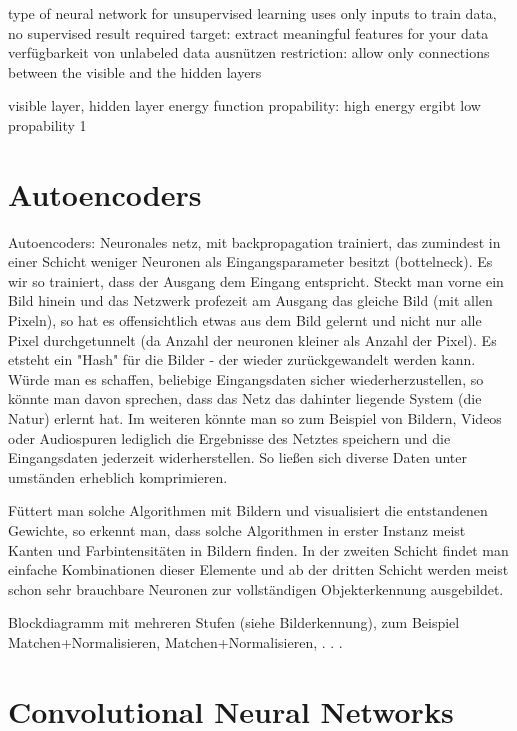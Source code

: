 type of neural network for unsupervised learning
uses only inputs to train data, no supervised result required
target: extract meaningful features for your data
verfügbarkeit von unlabeled data ausnützen
restriction: allow only connections between the visible and the hidden layers

visible layer, hidden layer
energy function
propability: high energy ergibt low propability
1


\section{Autoencoders}

Autoencoders: Neuronales netz, mit backpropagation trainiert, das zumindest in einer Schicht weniger Neuronen als Eingangsparameter besitzt (bottelneck). Es wir so trainiert, dass der Ausgang dem Eingang entspricht. Steckt man vorne ein Bild hinein und das Netzwerk profezeit am Ausgang das gleiche Bild (mit allen Pixeln), so hat es offensichtlich etwas aus dem Bild gelernt und nicht nur alle Pixel durchgetunnelt (da Anzahl der neuronen kleiner als Anzahl der Pixel).
Es etsteht ein "Hash" für die Bilder - der wieder zurückgewandelt werden kann. Würde man es schaffen, beliebige Eingangsdaten sicher wiederherzustellen, so könnte man davon sprechen, dass das Netz das dahinter liegende System (die Natur) erlernt hat. Im weiteren könnte man so zum Beispiel von Bildern, Videos oder Audiospuren lediglich die Ergebnisse des Netztes speichern und die Eingangsdaten jederzeit widerherstellen. So ließen sich diverse Daten unter umständen erheblich komprimieren.

Füttert man solche Algorithmen mit Bildern und visualisiert die entstandenen Gewichte, so erkennt man, dass solche Algorithmen in erster Instanz meist Kanten und Farbintensitäten in Bildern finden. In der zweiten Schicht findet man einfache Kombinationen dieser Elemente und ab der dritten Schicht werden meist schon sehr brauchbare Neuronen zur vollständigen Objekterkennung ausgebildet.

Blockdiagramm mit mehreren Stufen (siehe Bilderkennung), zum Beispiel Matchen+Normalisieren, Matchen+Normalisieren, . . .


\section{Convolutional Neural Networks}


